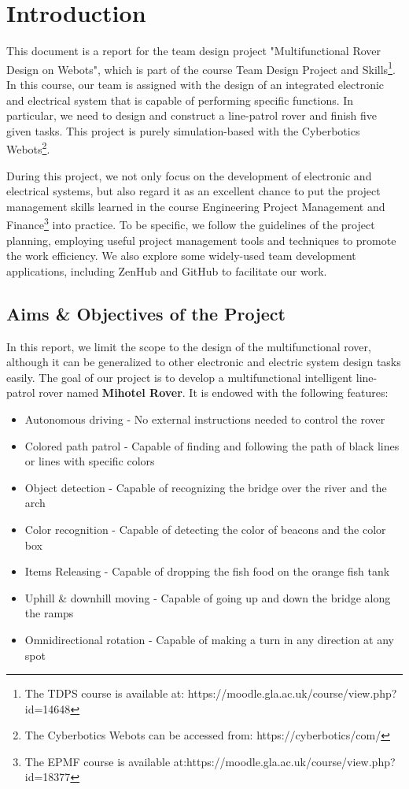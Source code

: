 \chapter{Introduction\label{chap1}}
This document is a report for the team design project "Multifunctional Rover Design on Webots", which is part of the course Team Design Project and Skills\footnote{The TDPS course is available at: https://moodle.gla.ac.uk/course/view.php?id=14648\label{course_website}}. In this course, our team is assigned with the design of an integrated electronic and electrical system that is capable of performing specific functions. In particular, we need to design and construct a line-patrol rover and finish five given tasks. This project is purely simulation-based with the Cyberbotics Webots\footnote{The Cyberbotics Webots can be accessed from: https://cyberbotics/com/}.

During this project, we not only focus on the development of electronic and electrical systems, but also regard it as an excellent chance to put the project management skills learned in the course Engineering Project Management and Finance\footnote{The EPMF course is available at:https://moodle.gla.ac.uk/course/view.php?id=18377} into practice. To be specific, we follow the guidelines of the project planning, employing useful project management tools and techniques to promote the work efficiency. We also explore some widely-used team development applications, including ZenHub and GitHub to facilitate our work.

\section{Aims \& Objectives of the Project}
In this report, we limit the scope to the design of the multifunctional rover, although it can be generalized to other electronic and electric system design tasks easily. The goal of our project is to develop a multifunctional intelligent line-patrol rover named \textbf{Mihotel Rover}. It is endowed with the following features: 
\begin{itemize}
    \item Autonomous driving - No external instructions needed to control the rover
    \item Colored path patrol - Capable of finding and following the path of black lines or lines with specific colors
    \item Object detection - Capable of recognizing the bridge over the river and the arch
    \item Color recognition - Capable of detecting the color of beacons and the color box 
    \item Items Releasing - Capable of dropping the fish food on the orange fish tank
    \item Uphill \& downhill moving - Capable of going up and down the bridge along the ramps
    \item Omnidirectional rotation - Capable of making a turn in any direction at any spot
\end{itemize}

